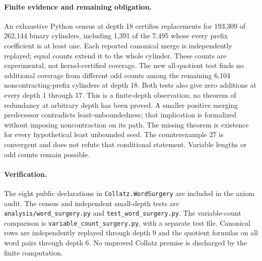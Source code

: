 \documentclass[10pt]{article}
\begin{document}
\paragraph{Finite evidence and remaining obligation.}
An exhaustive Python census at depth 18 certifies replacements for
193,309 of 262,144 binary cylinders, including 1,391 of the 7,495 whose
every prefix coefficient is at least one. Each reported canonical merge
is independently replayed; equal counts extend it to the whole cylinder.
These counts are experimental, not kernel-certified coverage.
The new all-quotient test finds no additional coverage from different odd
counts among the remaining 6,104 noncontracting-prefix cylinders at depth
18. Both tests also give zero additions at every depth 1 through 17.
This is a finite-depth observation; no theorem of redundancy at arbitrary
depth has been proved.
A smaller positive merging predecessor contradicts least-unboundedness;
that implication is formalized without imposing noncontraction on its path.
The missing theorem is existence for every hypothetical least unbounded
seed. The counterexample 27 is convergent and does not refute that
conditional statement. Variable lengths or odd counts remain possible.

\paragraph{Verification.}
The eight public declarations in \texttt{Collatz.WordSurgery} are included
in the axiom audit. The census and independent small-depth tests are
\texttt{analysis/word\_surgery.py} and \texttt{test\_word\_surgery.py}.
The variable-count comparison is \texttt{variable\_count\_surgery.py},
with a separate test file. Canonical rows are independently replayed
through depth 9 and the quotient formulas on all word pairs through depth 6.
No unproved Collatz premise is discharged by the finite computation.
\end{document}
